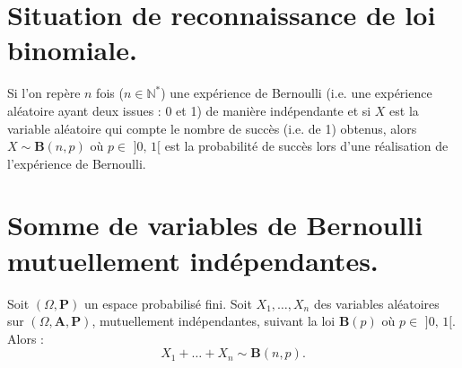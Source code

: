 \documentclass{article}
\begin{document}
\section{Situation de reconnaissance de loi binomiale.}
Si l'on repère $n$ fois ($n \in \mathbb{N}^*$) une expérience de Bernoulli (i.e. une expérience aléatoire ayant deux issues : 0 et 1) de manière indépendante et si $X$ est la variable aléatoire qui compte le nombre de succès (i.e. de 1) obtenus, alors $X \sim \mathbf{B}(n,p) \text{ où } p \in \text{ ]0, 1[}$ est la probabilité de succès lors d'une réalisation de l'expérience de Bernoulli.

\section{Somme de variables de Bernoulli mutuellement indépendantes.}
Soit $(\Omega, \mathbf{P})$ un espace probabilisé fini. Soit $X_1,\ldots, X_n$ des variables aléatoires sur $(\Omega, \mathbf{A}, \mathbf{P})$, mutuellement indépendantes, suivant la loi $\mathbf{B}(p) \text{ où } p \in \text{ ]0, 1[.}$
Alors : 
\[
    X_1 + \ldots + X_n \sim \mathbf{B}(n,p).
\]
\end{document}
